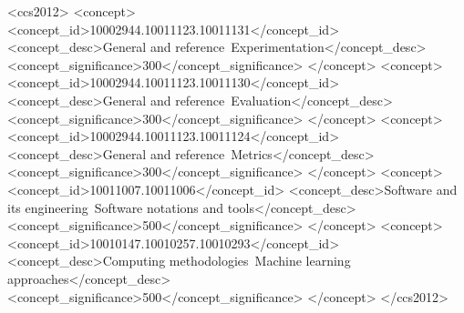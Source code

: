 \documentclass[sigplan,review,anonymous]{acmart}\settopmatter{printfolios=true,printccs=false,printacmref=false}
\begin{document}
\begin{CCSXML}
<ccs2012>
   <concept>
       <concept_id>10002944.10011123.10011131</concept_id>
       <concept_desc>General and reference~Experimentation</concept_desc>
       <concept_significance>300</concept_significance>
       </concept>
   <concept>
       <concept_id>10002944.10011123.10011130</concept_id>
       <concept_desc>General and reference~Evaluation</concept_desc>
       <concept_significance>300</concept_significance>
       </concept>
   <concept>
       <concept_id>10002944.10011123.10011124</concept_id>
       <concept_desc>General and reference~Metrics</concept_desc>
       <concept_significance>300</concept_significance>
       </concept>
   <concept>
       <concept_id>10011007.10011006</concept_id>
       <concept_desc>Software and its engineering~Software notations and tools</concept_desc>
       <concept_significance>500</concept_significance>
       </concept>
   <concept>
       <concept_id>10010147.10010257.10010293</concept_id>
       <concept_desc>Computing methodologies~Machine learning approaches</concept_desc>
       <concept_significance>500</concept_significance>
       </concept>
 </ccs2012>
\end{CCSXML}





\maketitle
\end{document}
